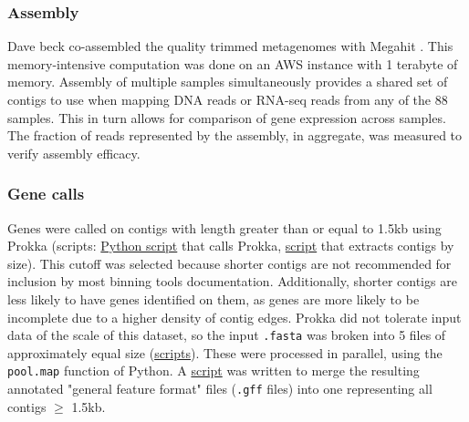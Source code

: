 \subsubsection{Assembly} %
Dave beck co-assembled the quality trimmed metagenomes with Megahit \cite{li2015}.
This memory-intensive computation was done on an AWS instance with 1 terabyte of memory.
Assembly of multiple samples simultaneously provides a shared set of contigs to use when mapping DNA reads or RNA-seq reads from any of the 88 samples.  %
This in turn allows for comparison of gene expression across samples.
The fraction of reads represented by the assembly, in aggregate, was measured to verify assembly efficacy.

\subsubsection{Gene calls}   %
Genes were called on contigs with length greater than or equal to 1.5kb using Prokka \cite{seemann2014} (scripts: \href{https://github.com/BeckResearchLab/meta4/blob/master/m4b_binning/assembly/prokka/prokka.py}{Python script} that calls Prokka, \href{https://github.com/BeckResearchLab/meta4/blob/master/m4b_binning/assembly/contigs_by_length/select_contigs_by_size.py}{script} that extracts contigs by size).
This cutoff was selected because shorter contigs are not recommended for inclusion by most binning tools documentation.
Additionally, shorter contigs are less likely to have genes identified on them, as genes are more likely to be incomplete due to a higher density of contig edges.
Prokka did not tolerate input data of the scale of this dataset, so the input \texttt{.fasta} was broken into 5 files of approximately equal size (\href{https://github.com/BeckResearchLab/meta4/tree/master/m4b_binning/assembly/prokka/contigs}{scripts}).
These were processed in parallel, using the \texttt{pool.map} function of Python.
A \href{https://github.com/BeckResearchLab/meta4/blob/master/m4b_binning/assembly/prokka/contigs/glue_together_gffs.py}{script} was written to merge the resulting annotated "general feature format" files (\texttt{.gff} files) into one representing all contigs $\geq$ 1.5kb.

